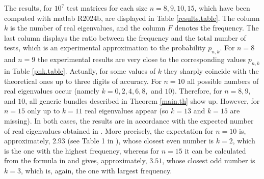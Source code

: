 \documentclass[a4paper]{article}
\begin{document}
The results, for $10^7$ test matrices for each size $n=8, 9, 10, 15$, which have been computed with {\sc matlab} R2024b, are displayed in Table \ref{results.table}. The column $k$ is the number of real eigenvalues, and the column $F$ denotes the frequency. The last column displays the ratio between the frequency and the total number of tests, which is an experimental approximation to the probability $p_{n,k}$. For $n=8$ and $n=9$ the experimental results are very close to the corresponding values $p_{n,k}$ in Table \ref{pnk.table}. Actually, for some values of $k$ they sharply coincide with the theoretical ones up to three digits of accuracy. For $n=10$ all possible numbers of real eigenvalues occur (namely $k=0,2,4,6,8,$ and $10)$. Therefore, for $n=8,9,$ and $10$, all generic bundles described in Theorem \ref{main.th} show up. However, for $n=15$ only up to $k=11$ real eigenvalues appear (so $k=13$ and $k=15$ are missing). In both cases, the results are in accordance with the expected number of real eigenvalues obtained in \cite{eks94}. More precisely, the expectation for $n=10$ is, approximately, $2.93$ (see Table 1 in \cite{eks94}), whose closest even number is $k=2$, which is the one with the highest frequency, whereas for $n=15$ it can be calculated from the formula in \cite[Cor. 5.3]{eks94} and gives, approximately, $3.51$, whose closest odd number is $k=3$, which is, again, the one with largest frequency.
\end{document}
